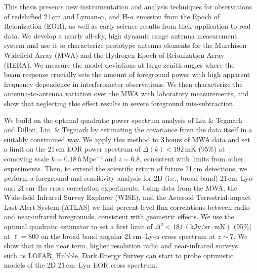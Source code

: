 % 
% 
%

This thesis presents new instrumentation and analysis techniques for observations of redshifted 21\,cm and Lyman-$\alpha$, and H-$\alpha$  emission from the Epoch of Reionization (EOR), as well as early science results from their application to real data. We develop a nearly all-sky, high dynamic range antenna measurement system and use it to characterize prototype antenna elements for the Murchison Widefield Array (MWA) and the Hydrogen Epoch of Reionization Array (HERA). We measure the model deviations at large zenith angles where the beam response crucially sets the amount of foreground power with high apparent frequency dependence in interferometer observations. We then characterize the antenna-to-antenna variation over the MWA with laboratory measurements, and show that neglecting this effect results in severe foreground mis-subtraction.

We build on the optimal quadratic power spectrum analysis of Liu \& Tegmark and Dillon, Liu, \& Tegmark by estimating the covariance from the data itself in a suitably constrained way. We apply this method to 3\,hours of MWA data and set a limit on the 21\,cm EOR power spectrum of $\Delta(k) < 192$\,mK (95\%) at comoving scale $k = 0.18$\,$h$\,Mpc$^{-1}$ and $z = 6.8$, consistent with limits from other experiments. Then, to extend the scientific return of future 21\,cm detections, we perform a foreground and sensitivity analysis for 2D (i.e., broad band) 21\,cm--Ly$\alpha$ and 21\,cm--H$\alpha$ cross correlation experiments. Using data from the MWA, the Wide-field Infrared Survey Explorer (WISE), and the Asteroid Terrestrial-impact Last Alert System (ATLAS) we find percent-level flux correlations between radio and near-infrared foregrounds, consistent with geometric effects. We use the optimal quadratic estimator to set a first limit of $\Delta^2<181\,(\text{kJy/sr}\cdot \text{mK})$ (95\%) at $\ell=800$ on the broad band angular 21\,cm--Ly-$\alpha$ cross spectrum at $z\sim7$. We show that in the near term, higher resolution radio and near-infrared surveys such as LOFAR, Hubble, Dark Energy Survey can start to probe optimistic models of the 2D 21\,cm--Ly$\alpha$ EOR cross spectrum. 

